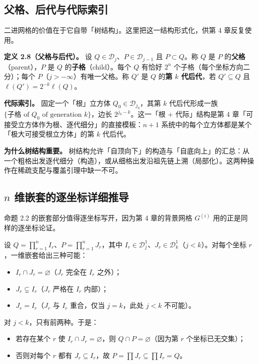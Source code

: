 \documentclass[a4paper,11pt,openany]{ctexbook}
\numberwithin{equation}{chapter}
\numberwithin{figure}{chapter}
\numberwithin{table}{chapter}
\begin{document}
\subsection{父格、后代与代际索引}

二进网格的价值在于它自带「树结构」。这里把这一结构形式化，供第 4 章反复使用。

\textbf{定义 2.8（父格与后代）。} 设 $Q\in\mathcal D_j$、$P\in\mathcal D_{j-1}$ 且 $P\subset Q$。称 $Q$ 是 $P$ 的\textbf{父格}（parent），$P$ 是 $Q$ 的\textbf{子格}（child）。每个 $Q$ 有恰好 $2^n$ 个子格（每个坐标方向二分）；每个 $P$（$j>-\infty$）有唯一父格。称 $Q'$ 是 $Q$ 的\textbf{第 $k$ 代后代}，若 $Q'\subseteq Q$ 且 $\ell(Q')=2^{-k}\ell(Q)$。

\textbf{代际索引。} 固定一个「根」立方体 $Q_0\in\mathcal D_{j_0}$，其第 $k$ 代后代形成一族 $\{\text{子格 of }Q_0\text{ of generation }k\}$，边长 $2^{j_0-k}$。这一「根 + 代际」结构是第 4 章「可接受立方体作为根、逐代细分」的直接模板：$n+1$ 系统中的每个立方体都是某个「极大可接受根立方体」的第 $k$ 代后代。

\textbf{为什么树结构重要。} 树结构允许「自顶向下」的构造与「自底向上」的汇总：从一个粗格出发逐代细分（构造），或从细格出发沿祖先链上溯（局部化）。这两种操作在稀疏支配与覆盖引理中缺一不可。

\subsection{$n$ 维嵌套的逐坐标详细推导}

命题 2.2 的嵌套部分值得逐坐标写开，因为第 4 章的背景网格 $G^{(i)}$ 用的正是同样的逐坐标论证。

设 $Q=\prod_{r=1}^n I_r$、$P=\prod_{r=1}^n J_r$，其中 $I_r\in\mathcal D_j^1$、$J_r\in\mathcal D_k^1$（$j<k$）。对每个坐标 $r$，一维嵌套给出三种可能：

\begin{itemize}
\item $I_r\cap J_r=\varnothing$（$J_r$ 完全在 $I_r$ 之外）；
\item $J_r\subsetneq I_r$（$J_r$ 严格在 $I_r$ 内部）；
\item $J_r=I_r$（$J_r$ 与 $I_r$ 重合，仅当 $j=k$，此处 $j<k$ 不可能）。
\end{itemize}

对 $j<k$，只有前两种。于是：

\begin{itemize}
\item 若存在某个 $r$ 使 $I_r\cap J_r=\varnothing$，则 $Q\cap P=\varnothing$（因为第 $r$ 个坐标已无交集）；
\item 否则对每个 $r$ 都有 $J_r\subseteq I_r$，故 $P=\prod J_r\subseteq\prod I_r=Q$。
\end{itemize}
\end{document}
